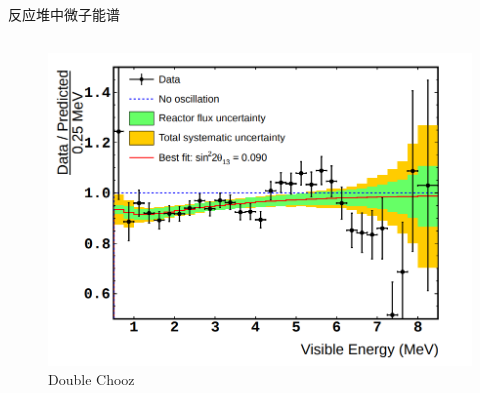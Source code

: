 \documentclass[11pt,compress,xcolor=x11names,UTF8]{beamer}
\begin{document}
\begin{frame}{反应堆中微子能谱}
\begin{columns}
\begin{column}{.45\textwidth}
\begin{figure}
\includegraphics[width=\textwidth]{k_doublechooz} %
\caption{Double Chooz}
\end{figure}
\end{column}
\end{columns}
\end{frame}
\end{document}
